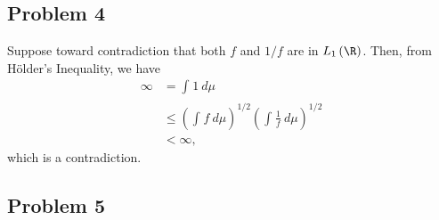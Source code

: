 \documentclass[10pt]{mypackage}
\begin{document}
\subsection{Problem 4}%
Suppose toward contradiction that both $f$ and $1/f$ are in $L_1\left( \R \right)$. Then, from Hölder's Inequality, we have
\begin{align*}
  \infty &= \int_{}^{} 1\:d\mu\\
         &\leq \left( \int_{}^{} f\:d\mu \right)^{1/2} \left( \int_{}^{} \frac{1}{f}\:d\mu \right)^{1/2}\\
         &< \infty,
\end{align*}
which is a contradiction.
\subsection{Problem 5}%
\end{document}
